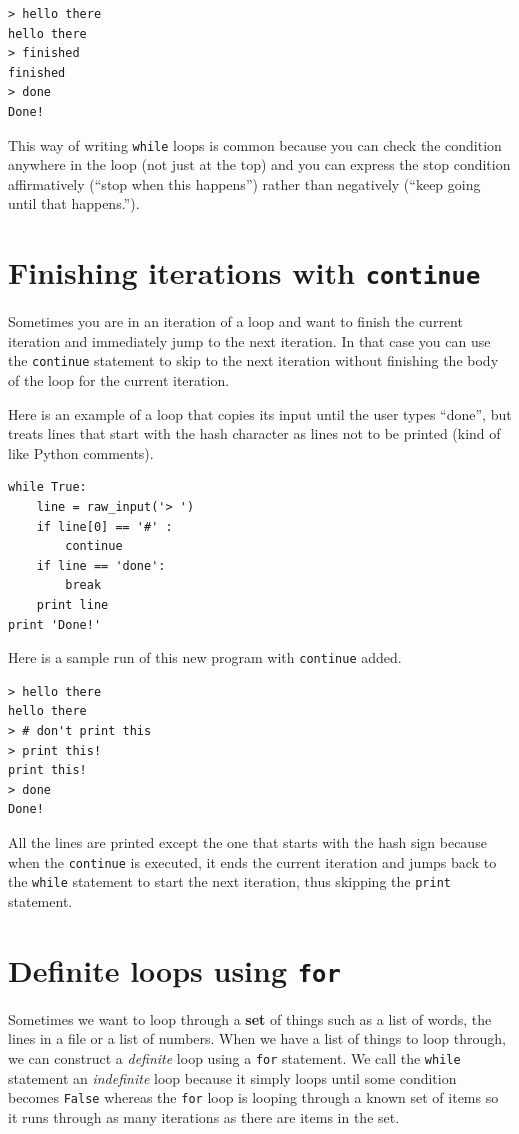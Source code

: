 \documentclass[10pt]{book}
\begin{document}
\beforeverb
\begin{verbatim}
> hello there
hello there
> finished
finished
> done
Done!
\end{verbatim}
\afterverb
%
This way of writing {\tt while} loops is common because you
can check the condition anywhere in the loop (not just at the
top) and you can express the stop condition affirmatively
(``stop when this happens'') rather than negatively (``keep going
until that happens.'').

\section{Finishing iterations with {\tt continue}}

Sometimes you are in an iteration of a loop and want to finish the
current iteration and immediately jump to the next iteration.
In that case you can use the {\tt continue}
statement to skip to the next iteration without finishing the
body of the loop for the current iteration.

Here is an example of a loop that copies its input until the user
types ``done'', but treats lines that start with the hash character
as lines not to be printed (kind of like Python comments).

\beforeverb
\begin{verbatim}
while True:
    line = raw_input('> ')
    if line[0] == '#' :
        continue
    if line == 'done':
        break
    print line
print 'Done!'
\end{verbatim}
\afterverb
%
Here is a sample run of this new program with {\tt continue} added.

\beforeverb
\begin{verbatim}
> hello there
hello there
> # don't print this
> print this!
print this!
> done
Done!
\end{verbatim}
\afterverb
%
All the lines are printed except the one that starts with the hash
sign because when the {\tt continue} is executed, it ends 
the current iteration and jumps
back to the {\tt while} statement to start the next iteration, thus 
skipping the {\tt print} statement.

\section{Definite loops using {\tt for} }

Sometimes we want to loop through a {\bf set} of things such 
as a list of words, the lines in a file or a list of numbers.
When we have a list of things to loop through, we can
construct a \emph{definite} loop using a {\tt for} statement.
We call the {\tt while} statement an \emph{indefinite} loop
because it simply loops until some condition becomes {\tt False} 
whereas the {\tt for} loop is looping through a known
set of items so it runs through as many iterations as there
are items in the set.
\end{document}
